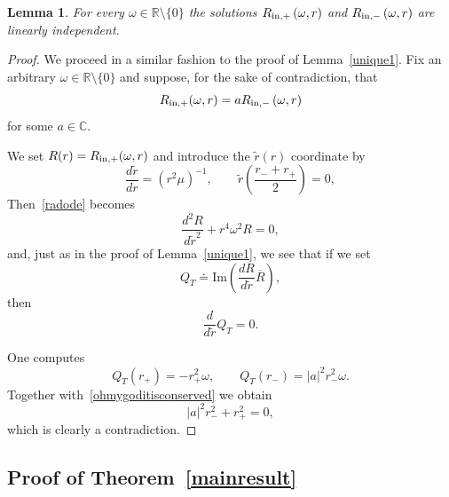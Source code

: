 \documentclass[A4,10pt]{article}
\newtheorem{lemma}{Lemma}[subsection]
\begin{document}
\begin{lemma}\label{unique2}For every $\omega \in \mathbb{R}\setminus\{0\}$ the solutions $R_{{\rm in},+}\left(\omega,r\right)$ and $R_{{\rm in},-}\left(\omega,r\right)$ are linearly independent. 
\end{lemma}
\begin{proof}We proceed in a similar fashion to the proof of Lemma~\ref{unique1}. Fix an arbitrary $\omega \in \mathbb{R}\setminus\{0\}$ and suppose, for the sake of contradiction, that
\[R_{{\rm in},+}(\omega,r) = a R_{{\rm in},-}\left(\omega,r\right)\]
for some $a \in \mathbb{C}$. 

We set $R(r) = R_{{\rm in},+}(\omega,r)$ and introduce the $\tilde r(r)$ coordinate by
\[\frac{d\tilde r}{dr} = \left(r^2\mu\right)^{-1},\qquad \tilde r\left(\frac{r_-+r_+}{2}\right) = 0,\]
Then~\eqref{radode} becomes
\begin{equation}\label{newradode}
\frac{d^2R}{d{\tilde r}^2} + r^4\omega^2 R = 0,
\end{equation}
and, just as in the proof of Lemma~\ref{unique1}, we see that if we set
\[Q_T \doteq \text{Im}\left(\frac{dR}{d\tilde r}\overline{R}\right),\]
then
\begin{equation}\label{ohmygoditisconserved}
\frac{d}{d\tilde r}Q_T = 0.
\end{equation}

One computes
\[Q_T\left(r_+\right) = -r_+^2\omega,\qquad Q_T\left(r_-\right) = |a|^2r_-^2\omega.\]
Together with~\eqref{ohmygoditisconserved} we obtain
\[|a|^2r_-^2 + r_+^2 = 0,\]
which is clearly a contradiction.
\end{proof}

\subsection{Proof of Theorem~\ref{mainresult}}\label{theproofode}
\end{document}
